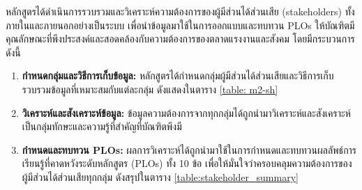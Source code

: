 
หลักสูตรได้ดำเนินการรวบรวมและวิเคราะห์ความต้องการของผู้มีส่วนได้ส่วนเสีย (stakeholders) ทั้งภายในและภายนอกอย่างเป็นระบบ เพื่อนำข้อมูลมาใช้ในการออกแบบและทบทวน PLOs ให้บัณฑิตมีคุณลักษณะที่พึงประสงค์และสอดคล้องกับความต้องการของตลาดแรงงานและสังคม โดยมีกระบวนการดังนี้

\begin{enumerate}
    \item \textbf{กำหนดกลุ่มและวิธีการเก็บข้อมูล:} หลักสูตรได้กำหนดกลุ่มผู้มีส่วนได้ส่วนเสียและวิธีการเก็บรวบรวมข้อมูลที่เหมาะสมกับแต่ละกลุ่ม ดังแสดงในตาราง \ref{table: m2-sh}
    
    \item \textbf{วิเคราะห์และสังเคราะห์ข้อมูล:} ข้อมูลความต้องการจากทุกกลุ่มได้ถูกนำมาวิเคราะห์และสังเคราะห์เป็นกลุ่มทักษะและความรู้ที่สำคัญที่บัณฑิตพึงมี
    
    \item \textbf{กำหนดและทบทวน PLOs:} ผลการวิเคราะห์ได้ถูกนำมาใช้ในการกำหนดและทบทวนผลลัพธ์การเรียนรู้ที่คาดหวังระดับหลักสูตร (PLOs) ทั้ง 10 ข้อ เพื่อให้มั่นใจว่าครอบคลุมความต้องการของผู้มีส่วนได้ส่วนเสียทุกกลุ่ม ดังสรุปในตาราง \ref{table:stakeholder_summary}
\end{enumerate}

